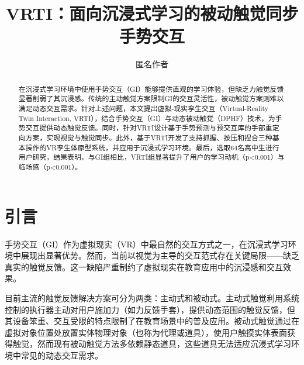 \documentclass[runningheads]{llncs}
\begin{document}
\title{VRTI：面向沉浸式学习的被动触觉同步手势交互}

 


\author{匿名作者}

\maketitle


\begin{abstract}
在沉浸式学习环境中使用手势交互（GI）能够提供直观的学习体验，但缺乏力触觉反馈显著削弱了其沉浸感。传统的主动触觉方案限制GI的交互灵活性，被动触觉方案则难以满足动态交互需求。针对上述问题，本文提出虚拟-现实孪生交互（Virtual-Reality Twin Interaction, VRTI），结合手势交互（GI）与动态被动触觉（DPHF）技术，为手势交互提供动态触觉反馈。同时，针对VRTI设计基于手势预测与预交互库的手部重定向方案，实现视觉与触觉同步。此外，基于VRTI开发了支持抓握、按压和捏合三种基本操作的VR孪生体原型系统，并应用于沉浸式学习环境。最后，选取64名高中生进行用户研究，结果表明，与GI组相比，VRTI组显著提升了用户的学习动机（p<0.001）与临场感（p<0.001）。

\end{abstract}

\section{引言}
手势交互（GI）作为虚拟现实（VR）中最自然的交互方式之一，在沉浸式学习环境中展现出显著优势\cite{fang2024interactive,amaral2024interactive}。然而，当前以视觉为主导的交互范式存在关键局限——缺乏真实的触觉反馈。这一缺陷严重制约了虚拟现实在教育应用中的沉浸感和交互效果。

目前主流的触觉反馈解决方案可分为两类：主动式和被动式。主动式触觉利用系统控制的执行器主动对用户施加力（如力反馈手套），提供动态范围的触觉反馈，但其设备笨重、交互受限的特点限制了在教育场景中的普及应用\cite{bonfert2023challenges,shigeyama2019transcalibur}。被动式触觉通过在虚拟对象位置处放置实体物理对象（也称为代理或道具），使用户触摸实体表面获得触觉\cite{hinckley1994passive}，然而现有被动触觉方法多依赖静态道具\cite{strandholt2020knock,fang2023vr,rettinger2023touching}，这些道具无法适应沉浸式学习环境中常见的动态交互需求。
\end{document}
